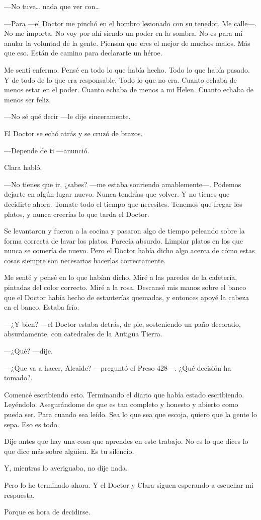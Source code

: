---No tuve\ldots{} nada que ver con\ldots{}

---Para ---el Doctor me pinchó en el hombro lesionado con su tenedor. Me
calle---. No me importa. No voy por ahí siendo un poder en la sombra. No
es para mí anular la voluntad de la gente. Piensan que eres el mejor de
muchos malos. Más que eso. Están de camino para declararte un héroe.

Me sentí enfermo. Pensé en todo lo que había hecho. Todo lo que había
pasado. Y de todo de lo que era responsable. Todo lo que no era. Cuanto
echaba de menos estar en el poder. Cuanto echaba de menos a mi Helen.
Cuanto echaba de menos ser feliz.

---No sé qué decir ---le dije sinceramente.

El Doctor se echó atrás y se cruzó de brazos.

---Depende de ti ---anunció.

Clara habló.

---No tienes que ir, ¿sabes? ---me estaba sonriendo amablemente---.
Podemos dejarte en algún lugar nuevo. Nunca tendrías que volver. Y no
tienes que decidirte ahora. Tomate todo el tiempo que necesites. Tenemos
que fregar los platos, y nunca creerías lo que tarda el Doctor.

Se levantaron y fueron a la cocina y pasaron algo de tiempo peleando
sobre la forma correcta de lavar los platos. Parecía absurdo. Limpiar
platos en los que nunca se comería de nuevo. Pero el Doctor había dicho
algo acerca de cómo estas cosas siempre son necesarias hacerlas
correctamente.

Me senté y pensé en lo que habían dicho. Miré a las paredes de la
cafetería, pintadas del color correcto. Miré a la rosa. Descansé mis
manos sobre el banco que el Doctor había hecho de estanterías quemadas,
y entonces apoyé la cabeza en el banco. Estaba frío.

---¿Y bien? ---el Doctor estaba detrás, de pie, sosteniendo un paño
decorado, absurdamente, con catedrales de la Antigua Tierra.

---¿Qué? ---dije.

---¿Que va a hacer, Alcaide? ---preguntó el Preso 428---. ¿Qué decisión
ha tomado?.

Comencé escribiendo esto. Terminando el diario que había estado
escribiendo. Leyéndolo. Asegurándome de que es tan completo y honesto y
abierto como pueda ser. Para cuando sea leído. Sea lo que sea que
escoja, quiero que la gente lo sepa. Eso es todo.

Dije antes que hay una cosa que aprendes en este trabajo. No es lo que
dices lo que dice más sobre alguien. Es tu silencio.

Y, mientras lo averiguaba, no dije nada.

Pero lo he terminado ahora. Y el Doctor y Clara siguen esperando a
escuchar mi respuesta.

Porque es hora de decidirse.